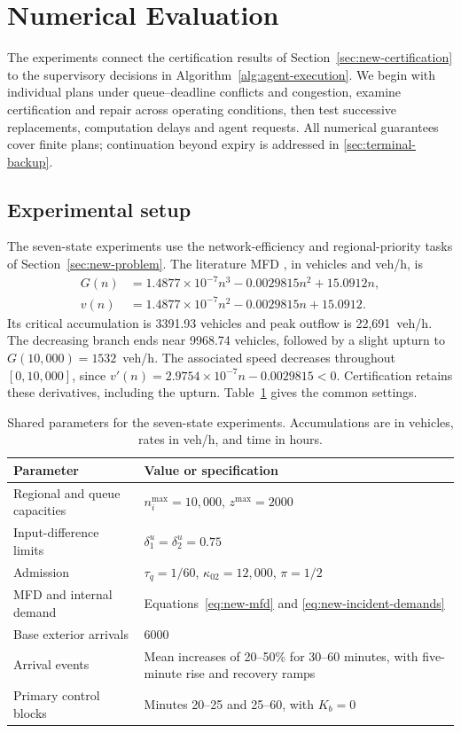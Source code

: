 \documentclass[preprint,12pt]{elsarticle}
\theoremstyle{definition}
\theoremstyle{plain}
\theoremstyle{definition}
\theoremstyle{plain}
\newcommand{\appref}[1]{\ref{#1}}
\begin{document}
\section{Numerical Evaluation}
\label{sec:new-evidence}

The experiments connect the certification results of
Section~\ref{sec:new-certification} to the supervisory decisions in
Algorithm~\ref{alg:agent-execution}. We begin with individual plans under
queue--deadline conflicts and congestion, examine certification and repair
across operating conditions, then test successive replacements, computation
delays and agent requests. All numerical
guarantees cover finite plans; continuation beyond expiry is addressed
in \appref{sec:terminal-backup}.

\subsection{Experimental setup}
\label{sec:experimental-setup}
The seven-state experiments use the network-efficiency and regional-priority
tasks of Section~\ref{sec:new-problem}. The literature MFD
\cite{zhong2018robust}, in vehicles and veh/h, is
\begin{equation}
\begin{aligned}
G(n)&=1.4877\times10^{-7}n^3-0.0029815n^2+15.0912n,\\
v(n)&=1.4877\times10^{-7}n^2-0.0029815n+15.0912.
\end{aligned}
\label{eq:new-mfd}
\end{equation}
Its critical accumulation is 3391.93 vehicles and peak outflow is
22,691~veh/h. The decreasing branch ends near 9968.74 vehicles, followed
by a slight upturn to $G(10{,}000)=1532$~veh/h. The associated speed
decreases throughout $[0,10{,}000]$, since
$v'(n)=2.9754\times10^{-7}n-0.0029815<0$. Certification retains these
derivatives, including the upturn. Table~\ref{tab:experiment-parameters}
gives the common settings.

\begin{table}[!htbp]
\centering\small
\caption{Shared parameters for the seven-state experiments. Accumulations
are in vehicles, rates in veh/h, and time in hours.}
\label{tab:experiment-parameters}
\begin{tabularx}{\linewidth}{@{}lX@{}}
\toprule
Parameter & Value or specification\\
\midrule
Regional and queue capacities & $n_i^{\max}=10{,}000$, $z^{\max}=2000$\\
Input-difference limits & $\delta_1^u=\delta_2^u=0.75$\\
Admission & $\tau_q=1/60$, $\kappa_{02}=12{,}000$, $\pi=1/2$\\
MFD and internal demand & Equations~\eqref{eq:new-mfd} and \eqref{eq:new-incident-demands}\\
Base exterior arrivals & $6000$\\
Arrival events & Mean increases of 20--50\% for 30--60 minutes, with
five-minute rise and recovery ramps\\
Primary control blocks & Minutes 20--25 and 25--60, with $K_b=0$\\
\bottomrule
\end{tabularx}
\end{table}
\end{document}
